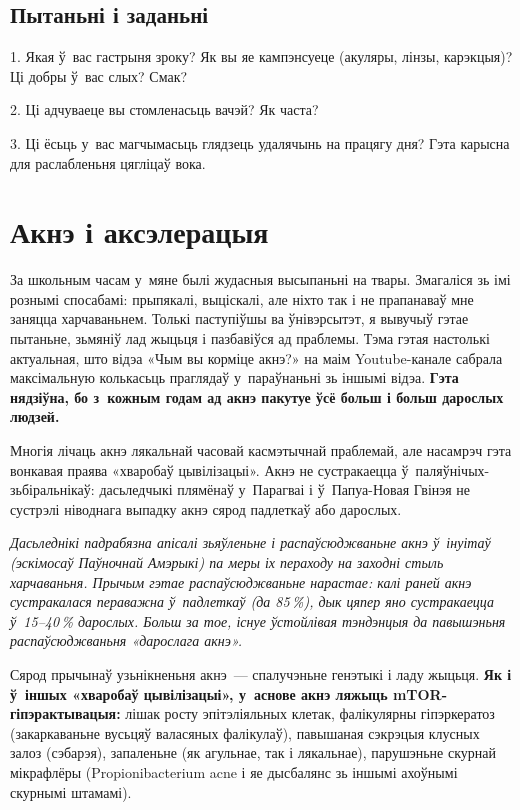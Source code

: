 \subsection*{Пытаньні і заданьні}

1. Якая ў~вас гастрыня зроку? Як вы яе кампэнсуеце (акуляры, лінзы, карэкцыя)? Ці добры ў~вас слых? Смак?

2. Ці адчуваеце вы стомленасьць вачэй? Як часта?

3. Ці ёсьць у~вас магчымасьць глядзець удалячынь на працягу дня? Гэта карысна для раслабленьня цягліцаў вока.


\section{Акнэ і аксэлерацыя}

За школьным часам у~мяне былі жудасныя высыпаньні на твары. Змагаліся зь імі рознымі спосабамі: прыпякалі, выціскалі, але ніхто так і не прапанаваў мне заняцца харчаваньнем. Толькі паступіўшы ва ўнівэрсытэт, я вывучыў гэтае пытаньне, зьмяніў лад жыцьця і пазбавіўся ад праблемы. Тэма гэтая настолькі актуальная, што відэа «Чым вы корміце акнэ?» на маім Youtube-канале сабрала максімальную колькасьць праглядаў у~параўнаньні зь іншымі відэа. \textbf{Гэта нядзіўна, бо з~кожным годам ад акнэ пакутуе ўсё больш і больш дарослых людзей.}

Многія лічаць акнэ лякальнай часовай касмэтычнай праблемай, але насамрэч гэта вонкавая праява «хваробаў цывілізацыі». Акнэ не сустракаецца ў~паляўнічых-зьбіральнікаў: дасьледчыкі плямёнаў у~Парагваі і ў~Папуа-Новая Гвінэя не сустрэлі ніводнага выпадку акнэ сярод падлеткаў або дарослых.

\emph{Дасьледнікі падрабязна апісалі зьяўленьне і распаўсюджваньне акнэ ў~інуітаў (эскімосаў Паўночнай Амэрыкі) па меры іх пераходу на заходні стыль харчаваньня. Прычым гэтае распаўсюджваньне нарастае: калі раней акнэ сустракалася пераважна ў~падлеткаў (да 85\,\%), дык цяпер яно сустракаецца ў~15--40\,\% дарослых. Больш за тое, існуе ўстойлівая тэндэнцыя да павышэньня распаўсюджваньня «дарослага акнэ».}

Сярод прычынаў узьнікненьня акнэ~--- спалучэньне генэтыкі і ладу жыцьця. \textbf{Як і ў~іншых «хваробаў цывілізацыі», у~аснове акнэ ляжыць mTOR-гіпэрактывацыя:} лішак росту эпітэліяльных клетак, фалікулярны гіпэркератоз (закаркаваньне вусьцяў валасяных фалікулаў), павышаная сэкрэцыя клусных залоз (сэбарэя), запаленьне (як агульнае, так і лякальнае), парушэньне скурнай мікрафлёры (Propionibacterium acne і яе дысбалянс зь іншымі ахоўнымі скурнымі штамамі).

